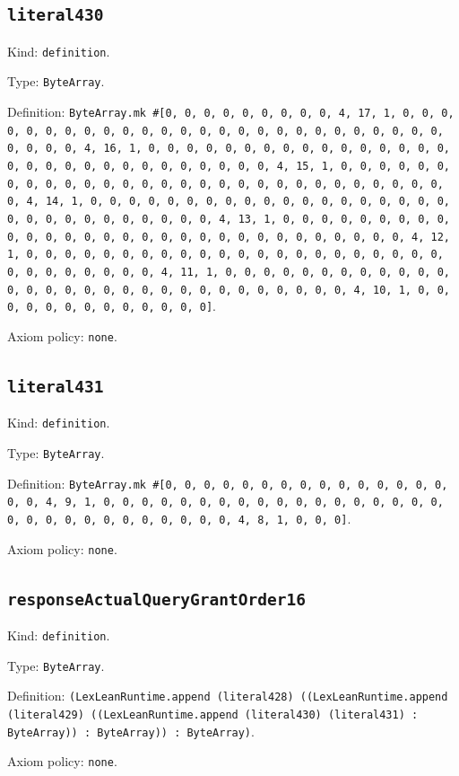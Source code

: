 \documentclass[11pt]{article}
\begin{document}
\subsection*{\texttt{literal430}}
\noindent Kind: \texttt{definition}.\par
\noindent Type: \texttt{ByteArray}.\par
\noindent Definition: \texttt{ByteArray.mk \#[0, 0, 0, 0, 0, 0, 0, 0, 0, 4, 17, 1, 0, 0, 0, 0, 0, 0, 0, 0, 0, 0, 0, 0, 0, 0, 0, 0, 0, 0, 0, 0, 0, 0, 0, 0, 0, 0, 0, 0, 0, 0, 4, 16, 1, 0, 0, 0, 0, 0, 0, 0, 0, 0, 0, 0, 0, 0, 0, 0, 0, 0, 0, 0, 0, 0, 0, 0, 0, 0, 0, 0, 0, 0, 0, 4, 15, 1, 0, 0, 0, 0, 0, 0, 0, 0, 0, 0, 0, 0, 0, 0, 0, 0, 0, 0, 0, 0, 0, 0, 0, 0, 0, 0, 0, 0, 0, 0, 4, 14, 1, 0, 0, 0, 0, 0, 0, 0, 0, 0, 0, 0, 0, 0, 0, 0, 0, 0, 0, 0, 0, 0, 0, 0, 0, 0, 0, 0, 0, 0, 0, 4, 13, 1, 0, 0, 0, 0, 0, 0, 0, 0, 0, 0, 0, 0, 0, 0, 0, 0, 0, 0, 0, 0, 0, 0, 0, 0, 0, 0, 0, 0, 0, 0, 4, 12, 1, 0, 0, 0, 0, 0, 0, 0, 0, 0, 0, 0, 0, 0, 0, 0, 0, 0, 0, 0, 0, 0, 0, 0, 0, 0, 0, 0, 0, 0, 0, 4, 11, 1, 0, 0, 0, 0, 0, 0, 0, 0, 0, 0, 0, 0, 0, 0, 0, 0, 0, 0, 0, 0, 0, 0, 0, 0, 0, 0, 0, 0, 0, 0, 4, 10, 1, 0, 0, 0, 0, 0, 0, 0, 0, 0, 0, 0, 0, 0]}.\par
\noindent Axiom policy: \texttt{none}.\par
\subsection*{\texttt{literal431}}
\noindent Kind: \texttt{definition}.\par
\noindent Type: \texttt{ByteArray}.\par
\noindent Definition: \texttt{ByteArray.mk \#[0, 0, 0, 0, 0, 0, 0, 0, 0, 0, 0, 0, 0, 0, 0, 0, 0, 4, 9, 1, 0, 0, 0, 0, 0, 0, 0, 0, 0, 0, 0, 0, 0, 0, 0, 0, 0, 0, 0, 0, 0, 0, 0, 0, 0, 0, 0, 0, 0, 0, 4, 8, 1, 0, 0, 0]}.\par
\noindent Axiom policy: \texttt{none}.\par
\subsection*{\texttt{responseActualQueryGrantOrder16}}
\noindent Kind: \texttt{definition}.\par
\noindent Type: \texttt{ByteArray}.\par
\noindent Definition: \texttt{(LexLeanRuntime.append (literal428) ((LexLeanRuntime.append (literal429) ((LexLeanRuntime.append (literal430) (literal431) : ByteArray)) : ByteArray)) : ByteArray)}.\par
\noindent Axiom policy: \texttt{none}.\par
\end{document}
